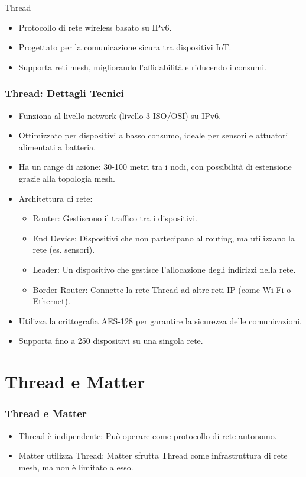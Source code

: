 \documentclass{beamer}
\begin{document}
	\begin{frame}{Thread}
		\begin{itemize}
			\item Protocollo di rete wireless basato su IPv6.
			\item Progettato per la comunicazione sicura tra dispositivi IoT.
			\item Supporta reti mesh, migliorando l'affidabilità e riducendo i consumi.
		\end{itemize}
	\end{frame}
	
\begin{frame}
	\frametitle{Thread: Dettagli Tecnici}
	\begin{itemize}
		\item Funziona al livello network (livello 3 ISO/OSI) su IPv6.
		\item Ottimizzato per dispositivi a basso consumo, ideale per sensori e attuatori alimentati a batteria.
		\item Ha un range di azione: 30-100 metri tra i nodi, con possibilità di estensione grazie alla topologia mesh.
		\item Architettura di rete:
		\begin{itemize}
			\item Router: Gestiscono il traffico tra i dispositivi.
			\item End Device: Dispositivi che non partecipano al routing, ma utilizzano la rete (es. sensori).
			\item Leader: Un dispositivo che gestisce l'allocazione degli indirizzi nella rete.
			\item Border Router: Connette la rete Thread ad altre reti IP (come Wi-Fi o Ethernet).
		\end{itemize}
		\item Utilizza la crittografia AES-128 per garantire la sicurezza delle comunicazioni.
		\item Supporta fino a 250 dispositivi su una singola rete.
	\end{itemize}
\end{frame}

\section{Thread e Matter}
\begin{frame}
	\frametitle{Thread e Matter}
	\begin{itemize}
		\item Thread è indipendente: Può operare come protocollo di rete autonomo.
		\item Matter utilizza Thread: Matter sfrutta Thread come infrastruttura di rete mesh, ma non è limitato a esso.
	\end{itemize}
\end{frame}
\end{document}
